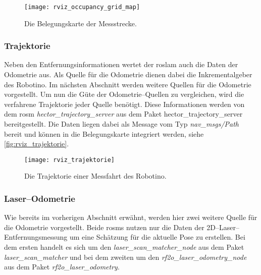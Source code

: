 \begin{figure}[h]
	\centering
	\texttt{[image: rviz\_occupancy\_grid\_map]}
	\caption{Die Belegungskarte der Messstrecke.}
	\label{fig:rviz_occupancy_grid_map}
\end{figure}
 

\begin{comment}
--------------------------------------------------------------------------------
- \url{http://wiki.ros.org/hector_trajectory_server}
- \url{http://docs.ros.org/api/nav_msgs/html/msg/Path.html}
\end{comment}
\subsubsection{Trajektorie}

Neben den Entfernungsinformationen wertet der \Gls{roslam} auch die Daten der Odometrie aus. Als Quelle für die Odometrie dienen dabei die Inkrementalgeber des Robotino. Im nächsten Abschnitt werden weitere Quellen für die Odometrie vorgestellt. Um nun die Güte der Odometrie--Quellen zu vergleichen, wird die verfahrene Trajektorie jeder Quelle benötigt. Diese Informationen werden von dem \Gls{rosm} \textit{hector\_trajectory\_server} aus dem Paket {hector\_trajectory\_server} bereitgestellt. Die Daten liegen dabei als Message vom Typ \textit{nav\_msgs/Path} bereit und können in die Belegungskarte integriert werden, siehe \autoref{fig:rviz_trajektorie}.

\begin{figure}[h]
	\centering
	\texttt{[image: rviz\_trajektorie]}
	\caption{Die Trajektorie einer Messfahrt des Robotino.}
	\label{fig:rviz_trajektorie}
\end{figure}


\begin{comment}
--------------------------------------------------------------------------------
- \url{http://wiki.ros.org/rf2o}
- \url{http://wiki.ros.org/laser_scan_matcher}
\end{comment}
\subsubsection{Laser--Odometrie}

Wie bereits im vorherigen Abschnitt erwähnt, werden hier zwei weitere Quelle für die Odometrie vorgestellt. Beide \Glspl{rosm} nutzen nur die Daten der 2D--Laser--Ent\-fern\-ungs\-mes\-sung um eine Schätzung für die aktuelle Pose zu erstellen. Bei dem ersten handelt es sich um den \textit{laser\_scan\_matcher\_node} aus dem Paket \textit{laser\_scan\_matcher} und bei dem zweiten um den \textit{rf2o\_laser\_odometry\_node} aus dem Paket \textit{rf2o\_laser\_odometry}.



